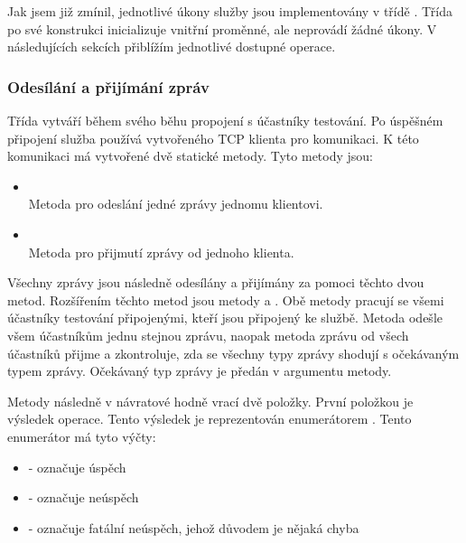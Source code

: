 Jak jsem již zmínil, jednotlivé úkony služby jsou implementovány v třídě . 
Třída po své konstrukci inicializuje vnitřní proměnné, ale neprovádí žádné úkony. V následujících sekcích přiblížím jednotlivé dostupné operace.

\subsubsection{Odesílání a přijímání zpráv}
Třída  vytváří během svého běhu propojení s účastníky testování. Po úspěšném připojení služba používá vytvořeného TCP klienta pro komunikaci. K této komunikaci má vytvořené dvě statické metody. Tyto metody jsou:

\begin{itemize}
    \item {} \\
    Metoda pro odeslání jedné zprávy jednomu klientovi.
    \item {} \\
    Metoda pro přijmutí zprávy od jednoho klienta.
\end{itemize}

Všechny zprávy jsou následně odesílány a přijímány za pomoci těchto dvou metod. Rozšířením těchto metod jsou metody  a . Obě metody pracují se všemi účastníky testování připojenými, kteří jsou připojený ke službě. Metoda  odešle všem účastníkům jednu stejnou zprávu, naopak metoda  zprávu od všech účastníků přijme a zkontroluje, zda se všechny typy zprávy shodují s očekávaným typem zprávy. Očekávaný typ zprávy je předán v argumentu metody. 

Metody následně v návratové hodně vrací dvě položky. První položkou je výsledek operace. Tento výsledek je reprezentován enumerátorem . Tento enumerátor má tyto výčty:

\begin{itemize}
    \item {} - označuje úspěch
    \item {} - označuje neúspěch
    \item {} - označuje fatální neúspěch, jehož důvodem je nějaká chyba
\end{itemize}

